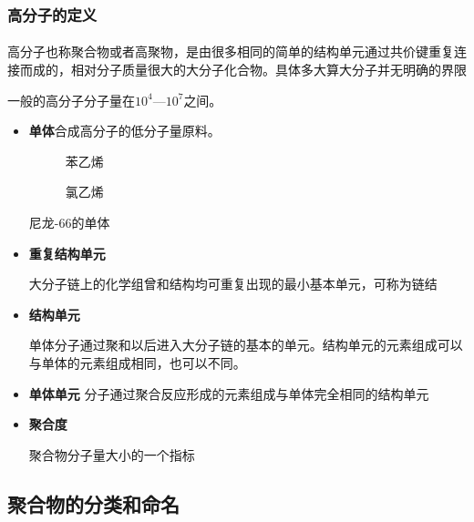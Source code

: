 ﻿\documentclass[12pt,a4paper]{article}
\begin{document}
\subsubsection{高分子的定义}
\paragraph{}
高分子也称聚合物或者高聚物，是由很多相同的简单的结构单元通过共价键重复连接而成的，相对分子质量很大的大分子化合物。具体多大算大分子并无明确的界限

一般的高分子分子量在$10^4\text{—}10^7$之间。

\begin{itemize}
\item {\bf{单体}}合成高分子的低分子量原料。
\begin{figure}[h]
\centering
{}

\begin{minipage}{0.42\textwidth}
\centering
{}

\vspace{0.8em}
苯乙烯
\end{minipage}
\hfill
\begin{minipage}{0.25\textwidth}
\centering
{}

\vspace{0.8em}
氯乙烯
\end{minipage}

\end{figure}

尼龙-66的单体
\item {\bf 重复结构单元}

大分子链上的化学组曾和结构均可重复出现的最小基本单元，可称为链结
\item {\bf 结构单元}

单体分子通过聚和以后进入大分子链的基本的单元。结构单元的元素组成可以与单体的元素组成相同，也可以不同。
\item {\bf 单体单元}
分子通过聚合反应形成的元素组成与单体完全相同的结构单元

\item {\bf 聚合度}

聚合物分子量大小的一个指标

\end{itemize}

\subsection{聚合物的分类和命名}
\end{document}
